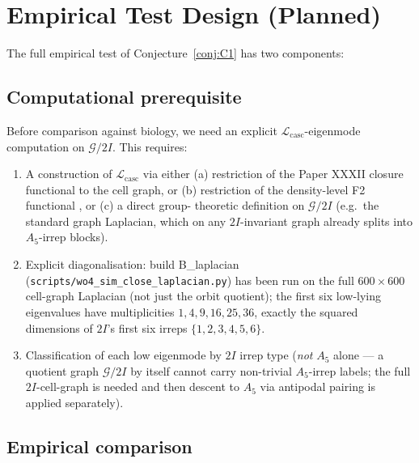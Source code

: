 \documentclass[12pt]{article}
\newcommand{\Lcasc}{\mathcal{L}_{\mathrm{casc}}}
\begin{document}
\section{Empirical Test Design (Planned)}\label{sec:empirical}

The full empirical test of Conjecture~\ref{conj:C1} has two
components:

\subsection{Computational prerequisite}

Before comparison against biology, we need an explicit
$\Lcasc$-eigenmode computation on $\mathcal{G}/2I$. This
requires:
\begin{enumerate}
\item A construction of $\Lcasc$ via either (a) restriction of
  the Paper XXXII closure functional
  \cite[\S 4]{SmartXXXII} to the cell graph, or (b) restriction
  of the density-level F2 functional
  \cite[\S F2]{CascadeFoundations}, or (c) a direct group-
  theoretic definition on $\mathcal{G}/2I$ (e.g.\ the standard
  graph Laplacian, which on any $2I$-invariant graph already
  splits into $A_5$-irrep blocks).
\item Explicit diagonalisation: build B\_laplacian
  (\texttt{scripts/wo4\_sim\_close\_laplacian.py}) has been run
  on the full $600 \times 600$ cell-graph Laplacian (not just
  the orbit quotient); the first six low-lying eigenvalues
  have multiplicities $1, 4, 9, 16, 25, 36$, exactly the
  squared dimensions of $2I$'s first six irreps
  $\{1, 2, 3, 4, 5, 6\}$.
\item Classification of each low eigenmode by $2I$ irrep type
  (\emph{not} $A_5$ alone — a quotient graph $\mathcal{G}/2I$ by
  itself cannot carry non-trivial $A_5$-irrep labels; the full
  $2I$-cell-graph is needed and then descent to $A_5$ via
  antipodal pairing is applied separately).
\end{enumerate}

\subsection{Empirical comparison}
\end{document}
